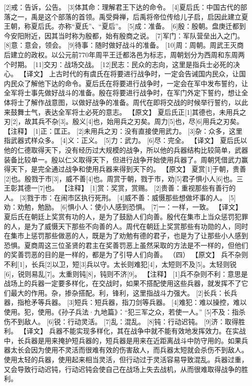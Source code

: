 \documentclass[a4paper,12pt,UTF8,twoside]{ctexbook}
\begin{document}
[2]戒：告诉，公告。
[3]体其命：理解君王下达的命令。
[4]夏后氏：中国古代的部落之一，禹是这个部落的首领。禹受舜禅，后禹将帝位传给儿子启，启因此建立夏王朝，称夏后氏。亦称“夏氏”、“夏后”。
[5]成：准备。
[6]殷：殷朝。盘庚迁都到今安阳附近，因其当时称为殷都，始有殷商之说。
[7]军门：军队营垒出入之门。
[8]意：意会，领会。
[9]待事：随时做好战斗的准备。
[10]周：周朝。周武王灭商后建立的政权。以公元前770年周平王迁都洛邑为标志，周朝划分为西周和东周两个时期。
[11]交刃：战场交战。
[12]民志：民众的志向，这里是指兵士必死的决心。
【译文】
上古时代的有虞氏在将要进行战争时，一定会告诫国内民众，让国内民众了解他下达的命令。夏后氏在将要进行战争时，一定会在军中发布誓约，让全军将士事先做好战斗的准备。殷在将要进行战争时，在军门外定下誓约，想让全体将士了解作战意图，以做好战争的准备。周代在即将交战的时候举行誓约，以此来鼓舞士气，表达全军将士必死的意志。
【原文】
夏后氏正[1]其德也，未用兵之刃[2]，故其兵不杂[3]。殷义[4]也，始用兵之刃矣。周力[5]也，尽[6]用兵之刃矣。
【注释】
[1]正：匡正。
[2]未用兵之刃：没有直接使用武力。
[3]杂：众多，这里指武器式样众多。
[4]义：正义。
[5]力：武力。
[6]尽：完全。
【译文】
夏后氏以他的仁德取得天下，没有经历过大规模的战争，所以他的兵器结构比较简单，武器装备比较单一。殷以仁义取得天下，但进行战争开始使用兵器了。周朝凭借武力赢得天下，是完全通过战争和使用兵器来得到天下的。
【原文】
夏赏[1]于朝，贵善[2]也。殷戮于市[3]，威不善[4]也。周赏于朝，戮于市，劝[5]君子惧小人[6]也。三王彰其德一[7]也。
【注释】
[1]赏：奖赏，赏赐。
[2]贵善：重视那些有善行的人。
[3]戮于市：在闹市区执行死刑。
[4]威不善：威慑那些想做坏事的人。
[5]劝：劝勉，勉励。
[6]惧小人：使小人感到恐惧。
[7]一：一样，一致。
【译文】
夏后氏在朝廷上奖赏有功的人，是为了鼓励人们向善。殷代在集市上当众惩罚犯罪的人，是为了威慑天下那些不向善的人。周代在朝廷上奖赏那些有功勋的人，同时在集市上惩罚那些做恶的人，既是为了劝勉有德的君子，也是为了让那些小人感到恐惧。夏商周这三位圣贤的君主在奖善罚恶上虽然采取的方法是不一样的，但他们的奖善罚恶的目的是一样的，都是为了引导人们向善。
（四）
【原文】
兵不杂则不利[1]，长兵[2]以卫，短[3]兵以守。太长则难犯[4]，太短则不及[5]。太轻则锐[6]，锐则易乱[7]。太重则钝[8]，钝则不济[9]。
【注释】
[1]兵不杂则不利：意思是战场上的兵器一定要多样化，在交战时，如果不搭配使用这些兵器，就发挥不了它们最大的作用。杂，掺杂搭配。利，锋利，这里指战斗力强大。
[2]长兵：长兵器，指枪矛等兵器。
[3]短兵：短兵器，指刀剑等兵器。
[4]难犯：难以操控，难以使用。犯，使用。《孙子兵法·九地篇》：“犯三军之众，若使一人。”
[5]不及：指杀伤不到敌人。
[6]锐：行动灵活。
[7]乱：混乱。
[8]钝：行动迟钝。
[9]济：取得胜利。
【译文】
兵器不能实现多样化，其在战争中就不能有效地发挥效力。在实战中，长兵器是用来掩护短兵器的，短兵器是用来在近距离战斗中防守用的。如果兵器太长会因为使用不灵活而很难有效的伤害敌人，而兵器太短就会杀伤不到敌人。使用太轻的兵器，使用起来相当灵活，但行动过于灵活容易导致混乱。兵器过重，又会导致行动迟钝，行动迟钝会使自己在战场上失去战机，从而很难取得战争的胜利。
\end{document}
